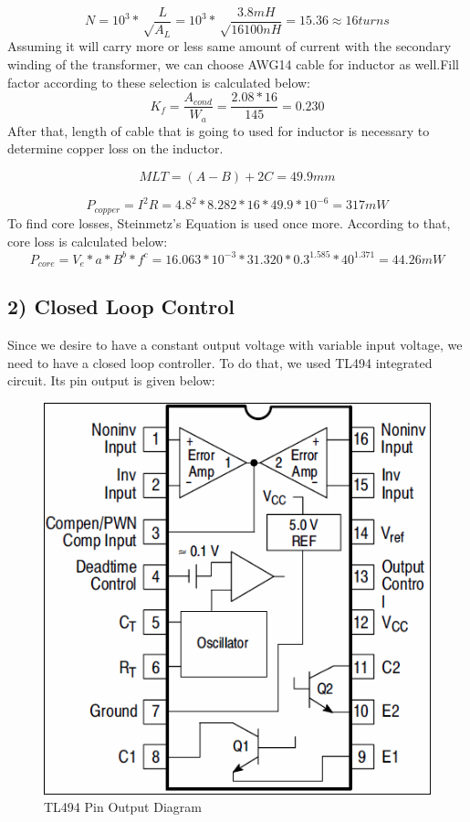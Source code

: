 \documentclass{article}
\newcommand\tab[1][1cm]{\hspace*{#1}}
\begin{document}
\begin{equation*}
    N=10^3*\sqrt\frac{L}{A_L}=10^3*\sqrt\frac{3.8 mH}{16100 nH}=15.36 \approx 16 turns
\end{equation*}
Assuming it will carry more or less same amount of current with the secondary winding of the transformer, we can choose AWG14 cable for inductor as well.Fill factor according to these selection is calculated below:
\begin{equation*}
    K_f=\frac{A_{cond}}{W_a}=\frac{2.08*16}{145}=0.230
\end{equation*}
After that, length of cable that is going to used for inductor is necessary to determine copper loss on the inductor. 

\begin{equation*}
    MLT=(A-B)+2C=49.9 mm
\end{equation*}

\begin{equation*}
    P_{copper}=I^2R=4.8^2*8.282*16*49.9*10^{-6}=317 mW
\end{equation*}
\tab To find core losses, Steinmetz's Equation is used once more.  According to that, core loss is calculated below:
\begin{equation*}
    P_{core}=V_e*a*B^b*f^c=16.063*10^{-3}*31.320*0.3^{1.585}*40^1.371=44.26 mW
\end{equation*}
\subsection*{2) Closed Loop Control}
\tab Since we desire to have a constant output voltage with variable input voltage, we need to have a closed loop controller. To do that, we used TL494 integrated circuit. Its pin output is given below:

\begin{figure}[H]
    \centering
    \includegraphics[scale=0.2]{tl494.png}
    \caption{TL494 Pin Output Diagram}
    \label{fig:my_label}
\end{figure}
\end{document}
